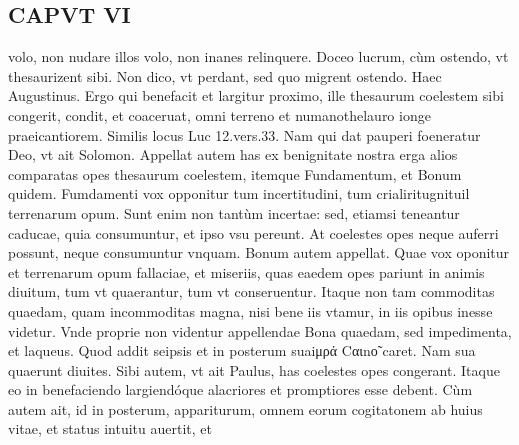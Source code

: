 \documentclass{article}
\begin{document}
\begin{pages}
\section*{CAPVT  VI }
\marginpar{[ p.5 09 ]}\pstart volo, non nudare illos volo, non inanes relinquere. Doceo lucrum, cùm ostendo, vt thesaurizent sibi. Non dico, vt perdant, sed quo migrent ostendo. Haec Augustinus. Ergo qui benefacit et largitur proximo, ille thesaurum coelestem sibi congerit, condit, et coaceruat, omni terreno et numanothelauro ionge praeicantiorem. Similis locus Luc 12.vers.33. Nam qui dat pauperi foeneratur Deo, vt ait Solomon.  \pend\pstart Appellat autem has ex benignitate nostra erga alios comparatas opes thesaurum coelestem, itemque Fundamentum, et Bonum quidem. Fumdamenti vox opponitur tum incertitudini, tum crialiritugnituil terrenarum opum. Sunt enim non tantùm incertae: sed, etiamsi teneantur caducae, quia consumuntur, et ipso vsu pereunt. At coelestes opes neque auferri possunt, neque consumuntur vnquam.  \pend\pstart Bonum autem appellat. Quae vox oponitur et terrenarum opum fallaciae, et miseriis, quas eaedem opes pariunt in animis diuitum, tum vt quaerantur, tum vt conseruentur. Itaque non tam commoditas quaedam, quam incommoditas magna, nisi bene iis vtamur, in iis opibus inesse videtur. Vnde proprie non videntur appellendae Bona quaedam, sed impedimenta, et laqueus.  \pend\pstart Quod addit seipsis et in posterum suaiμρά Cαιnο̃ caret. Nam sua quaerunt diuites. Sibi autem, vt ait Paulus, has coelestes opes congerant. Itaque  eo in benefaciendo largiendóque alacriores et promptiores esse debent. Cùm autem ait, id in posterum, appariturum, omnem eorum cogitatonem ab huius vitae, et status intuitu auertit, et  \pend

\end{pages}
\end{document}
